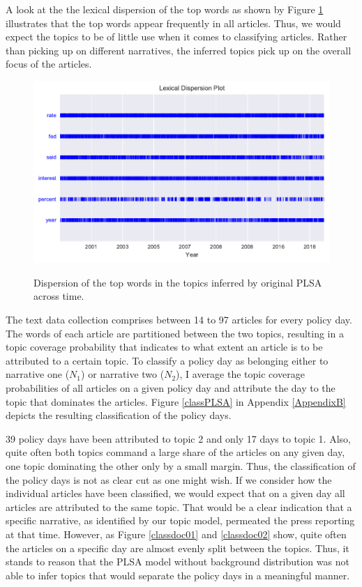 \documentclass[11pt,a4paper,english,oneside]{book}
\numberwithin{equation}{chapter}
\begin{document}
A look at the the lexical dispersion of the top words as shown by Figure \ref{dispersionPLSAorig} illustrates that the top words appear frequently in all articles. Thus, we would expect the topics to be of little use when it comes to classifying articles. Rather than picking up on different narratives, the inferred topics pick up on the overall focus of the articles. 

\begin{figure}
	\caption{Dispersion of the top words in the topics inferred by original PLSA across time.}
	\centering
	\includegraphics[scale=1]{Images/dispersionplot_topicPLSAorig.pdf}
	\label{dispersionPLSAorig}
\end{figure}

The text data collection comprises between 14 to 97 articles for every policy day. The words of each article are partitioned between the two topics, resulting in a topic coverage probability that indicates to what extent an article is to be attributed to a certain topic. To classify a policy day as belonging either to narrative one ($N_1$) or narrative two ($N_2$), I average the topic coverage probabilities of all articles on a given policy day and attribute the day to the topic that dominates the articles. Figure \ref{classPLSA} in Appendix \ref{AppendixB} depicts the resulting classification of the policy days. 

39 policy days have been attributed to topic 2 and only 17 days to topic 1. Also, quite often both topics command a large share of the articles on any given day, one topic dominating the other only by a small margin. Thus, the classification of the policy days is not as clear cut as one might wish. If we consider how the individual articles have been classified, we would expect that on a given day all articles are attributed to the same topic. That would be a clear indication that a specific narrative, as identified by our topic model, permeated the press reporting at that time. However, as Figure \ref{classdoc01} and \ref{classdoc02} show, quite often the articles on a specific day are almost evenly split between the topics.  
Thus, it stands to reason that the PLSA model without background distribution was not able to infer topics that would separate the policy days in a meaningful manner.
\end{document}
